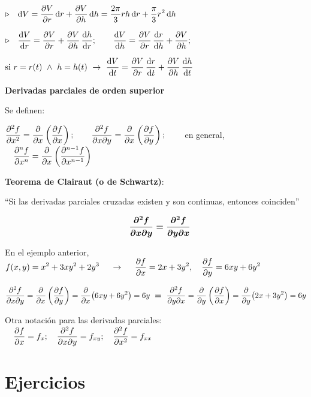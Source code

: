 \vspace{3mm}\textcolor{gris}{$\triangleright \quad \displaystyle \dd V= \pdv{V}{r}\, \dd r + \pdv{V}{h} \, \dd h=\dfrac{2\pi}3 rh \, \dd r + \dfrac \pi 3 r^2 \, \dd h  $}

\vspace{3mm}\textcolor{gris}{$\triangleright \quad \displaystyle \dv{V}{r}=\pdv{V}{r}+\pdv{V}{h}\, \dv{h}{r};\qquad  \dv{V}{h}=\pdv{V}{r}\, \dv{r}{h}+\pdv{V}{h};$}

\vspace{1mm}\textcolor{gris}{$\displaystyle \text{si } r=r(t) \ \wedge \ h=h(t) \ \to \  \dv{V}{t}=\pdv{V}{r} \, \dv{r}{t}+\pdv{V}{h} \, \dv{h}{t}$}

\vspace{5mm} \textbf{Derivadas parciales de orden superior}

Se definen:

$\displaystyle \pdv[2]{f}{x}=\pdv{x} \left( \pdv{f}{x} \right);\qquad  \pdv[2]{f}{x}{y}=\pdv{x} \left( \pdv{f}{y} \right);\qquad $ en general, $\quad \displaystyle \pdv[n]{f}{x} =\pdv{x} \left( \pdv[n-1]{f}{x} \right)$


\begin{cuadro-naranja}
	
\textbf{Teorema de Clairaut (o de Schwartz)}:

``Si las derivadas parciales cruzadas existen y son continuas, entonces coinciden'' 

$$\quad \displaystyle \boldsymbol{\pdv[2]{f}{x}{y}=\pdv[2]{f}{y}{x}}$$
\end{cuadro-naranja}

\vspace{2mm}\textcolor{gris}{En el ejemplo anterior, $ \displaystyle f(x,y)=x^2+3xy^2+2y^3 \ \quad \to \ \quad 
\displaystyle \pdv{f}{x}=2x+3y^2,\quad \pdv{f}{y}=6xy+6y^2 $}

\vspace{2mm}\textcolor{gris}{$\displaystyle \pdv[2]{f}{x}{y}=\pdv{x} \left( \pdv{f}{y} \right) = \pdv{x}(6xy+6y^2)=6y \ \boldsymbol{=} \ \pdv[2]{f}{y}{x}=\pdv{y} \left( \pdv{f}{x} \right) = \pdv{y} (2x+3y^2)=6y  $} 


\vspace{5mm} Otra notación para las derivadas parciales: $\quad \displaystyle \pdv{f}{x}=f_x;\quad \pdv[2]{f}{x}{y}=f_{xy};\quad \pdv[2]{f}{x}=f_{xx}$



\vspace{1cm}
\section{Ejercicios}
\vspace{0.5cm}


